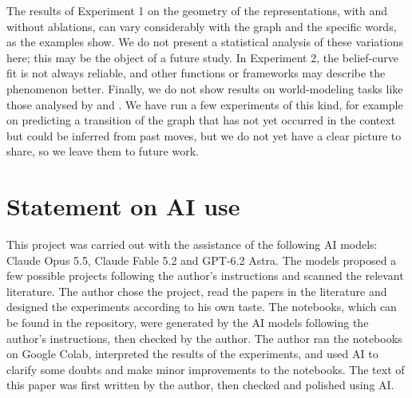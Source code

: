 \documentclass[11pt,a4paper]{article}
\begin{document}
The results of Experiment 1 on the geometry of the representations, with and without ablations, can vary considerably
with the graph and the specific words, as the examples show. We do not
present a statistical analysis of these variations here; this may be the object of a future study. In Experiment 2,
the belief-curve fit is not always reliable, and other functions or frameworks may describe the phenomenon better.
Finally, we do not show results on world-modeling tasks like those analysed by \citet{lepori2026} and
\citet{matsutani2026}. We have run a few experiments of this kind, for example on predicting a transition of the graph
that has not yet occurred in the context but could be inferred from past moves, but we do not yet have a clear picture
to share, so we leave them to future work.

\section*{Statement on AI use}

This project was carried out with the assistance of the following AI models: Claude Opus 5.5, Claude Fable 5.2 and
GPT-6.2 Astra. The models proposed a few possible projects following the author's instructions and scanned the
relevant literature. The author chose the project, read the papers in the literature and designed the experiments
according to his own taste. The notebooks, which can be found in the repository, were generated by the AI models
following the author's instructions, then checked by the author. The author ran the notebooks on Google Colab,
interpreted the results of the experiments, and used AI to clarify some doubts and make minor improvements to the
notebooks. The text of this paper was first written by the author, then checked and polished using AI.
\end{document}
